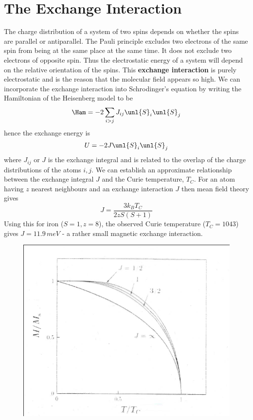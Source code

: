 \documentclass[a4paper, 11pt, normalem]{report}
\begin{document}
\section{The Exchange Interaction}
The charge distribution of a system of two spins depends on whether the spins are parallel or antiparallel. 
The Pauli principle excludes two electrons of the same spin from being at the same place at the same time.
It does not exclude two electrons of opposite spin. 
Thus the electrostatic energy of a system will depend on the relative orientation of the spins. 
This \textbf{exchange interaction} is purely electrostatic and is the reason that the molecular field appears so high. 
We can incorporate the exchange interaction into Schrodinger's equation by writing the Hamiltonian of the Heisenberg model to be 
\begin{equation}
    \Ham = -2\sum_{i>j} J_{ij}\unl{S}_i \unl{S}_j
\end{equation}
hence the exchange energy is
\begin{equation}
    U = -2J\unl{S}_i\unl{S}_j
\end{equation}
where $J_{ij}$ or $J$ is the exchange integral and is related to the overlap of the charge distributions of the atoms $i,j$.
We can establish an approximate relationship between the exchange integral $J$ and the Curie temperature, $T_C$.
For an atom having $z$ nearest neighbours and an exchange interaction $J$ then mean field theory gives
\begin{equation}
    J = \frac{3k_BT_C}{2zS(S+1)}
\end{equation}
Using this for iron ($S=1,z=8$), the observed Curie temperature ($T_C = 1043$) gives $J = 11.9\,meV$ - a rather small magnetic exchange interaction. 
\begin{figure}[H]
    \centering
    \includegraphics[scale=0.5]{exchange.png}
\end{figure}
\end{document}
